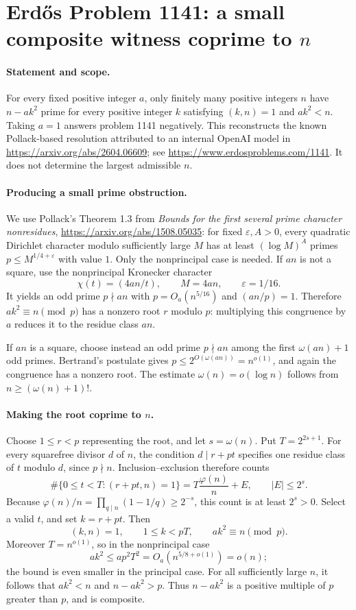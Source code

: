 \section*{Erd\H{o}s Problem 1141: a small composite witness coprime to \(n\)}

\paragraph{Statement and scope.}
For every fixed positive integer \(a\), only finitely many positive integers \(n\) have \(n-ak^2\) prime for every positive integer \(k\) satisfying \((k,n)=1\) and \(ak^2<n\). Taking \(a=1\) answers problem 1141 negatively.
This reconstructs the known Pollack-based resolution attributed to an internal OpenAI model in \url{https://arxiv.org/abs/2604.06609}; see \url{https://www.erdosproblems.com/1141}. It does not determine the largest admissible \(n\).

\paragraph{Producing a small prime obstruction.}
We use Pollack's Theorem 1.3 from \emph{Bounds for the first several prime character nonresidues}, \url{https://arxiv.org/abs/1508.05035}: for fixed \(\varepsilon,A>0\), every quadratic Dirichlet character modulo sufficiently large \(M\) has at least \((\log M)^A\) primes \(p\leq M^{1/4+\varepsilon}\) with value \(1\). Only the nonprincipal case is needed.
If \(an\) is not a square, use the nonprincipal Kronecker character
\[
 \chi(t)=(4an/t),\qquad M=4an,\qquad \varepsilon=1/16.
\]
It yields an odd prime \(p\nmid an\) with \(p=O_a(n^{5/16})\) and \((an/p)=1\). Therefore \(ak^2\equiv n\pmod p\) has a nonzero root \(r\) modulo \(p\): multiplying this congruence by \(a\) reduces it to the residue class \(an\).

If \(an\) is a square, choose instead an odd prime \(p\nmid an\) among the first \(\omega(an)+1\) odd primes. Bertrand's postulate gives \(p\leq2^{O(\omega(an))}=n^{o(1)}\), and again the congruence has a nonzero root. The estimate \(\omega(n)=o(\log n)\) follows from \(n\geq(\omega(n)+1)!\).

\paragraph{Making the root coprime to \(n\).}
Choose \(1\leq r<p\) representing the root, and let \(s=\omega(n)\). Put \(T=2^{2s+1}\).
For every squarefree divisor \(d\) of \(n\), the condition
\(d\mid r+pt\) specifies one residue class of \(t\) modulo \(d\), since \(p\nmid n\).
Inclusion--exclusion therefore counts
\[
 \#\{0\leq t<T:(r+pt,n)=1\}
 =T\frac{\varphi(n)}n+E,\qquad |E|\leq2^s.
\]
Because \(\varphi(n)/n=\prod_{q\mid n}(1-1/q)\geq2^{-s}\), this count is at least \(2^s>0\). Select a valid \(t\), and set \(k=r+pt\).
Then
\[
 (k,n)=1,\qquad 1\leq k<pT,\qquad ak^2\equiv n\pmod p.
\]
Moreover \(T=n^{o(1)}\), so in the nonprincipal case
\[
 ak^2\leq a p^2T^2=O_a(n^{5/8+o(1)})=o(n);
\]
the bound is even smaller in the principal case.
For all sufficiently large \(n\), it follows that \(ak^2<n\) and \(n-ak^2>p\). Thus \(n-ak^2\) is a positive multiple of \(p\) greater than \(p\), and is composite.

